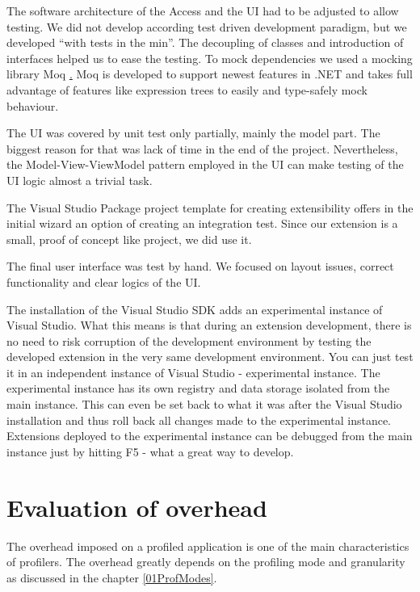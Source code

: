 The software architecture of the Access and the UI had to be adjusted to allow testing. We did not develop according test driven development paradigm, but we developed ``with tests in the min''. The decoupling of classes and introduction of interfaces helped us to ease the testing. To mock dependencies we used a mocking library Moq \href{{http://code.google.com/p/moq/}{http://code.google.com/p/moq/}}. Moq is developed to support newest features in .NET and takes full advantage of features like expression trees to easily and type-safely mock behaviour. 

The UI was covered by unit test only partially, mainly the model part. The biggest reason for that was lack of time in the end of the project. Nevertheless, the Model-View-ViewModel pattern employed in the UI can make testing of the UI logic almost a trivial task. 

The Visual Studio Package project template for creating extensibility offers in the initial wizard an option of creating an integration test. Since our extension is a small, proof of concept like project, we did use it. 

The final user interface was test by hand. We focused on layout issues, correct functionality and clear logics of the UI.

The installation of the Visual Studio SDK adds an experimental instance of Visual Studio. What this means is that during an extension development, there is no need to risk corruption of the development environment by testing the developed extension in the very same development environment. You can just test it in an independent instance of Visual Studio - experimental instance. The experimental instance has its own registry and data storage isolated from the main instance. This can even be set back to what it was after the Visual Studio installation and thus roll back all changes made to the experimental instance. Extensions deployed to the experimental instance can be debugged from the main instance just by hitting F5 - what a great way to develop. 



\section{Evaluation of overhead}
The overhead imposed on a profiled application is one of the main characteristics of profilers. The overhead greatly depends on the profiling mode and granularity as discussed in the chapter \ref{01ProfModes}.

